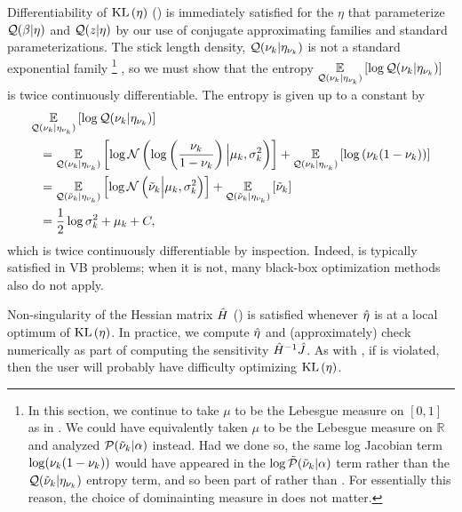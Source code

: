 Differentiability of $\mathrm{KL}\left(\eta\right)$ () is
immediately satisfied for the $\eta$ that parameterize $\mathcal{Q}(\beta \vert \eta)$
and $\mathcal{Q}(z \vert \eta)$ by our use of conjugate approximating families and
standard parameterizations.  The stick length density, $\mathcal{Q}(\nu_{k} \vert \eta_{\nu_{k}})$
is not a standard exponential family
%
\footnote{In this section, we continue to take $\mu$ to be the Lebesgue measure
on $[0,1]$ as in .  We could have equivalently taken
$\mu$ to be the Lebesgue measure on $\mathbb{R}$ and analyzed $\mathcal{P}(\tilde{\nu}_{k} \vert
\alpha)$ instead.  Had we done so, the same log Jacobian term $\log (\nu_{k}(1 -
\nu_{k}))$ would have appeared in the $\log \tilde{\mathcal{P}}(\tilde{\nu}_{k} \vert \alpha)$ term rather
than the $\mathcal{Q}(\tilde{\nu}_{k} \vert \eta_{\nu_{k}})$ entropy term, and so been part of
 rather than .  For
essentially this reason, the choice of dominainting measure in 
does not matter.}
%
, so we must show that the entropy $\underset{\mathcal{Q}(\nu_{k} \vert \eta_{\nu_{k}})}{\mathbb{E}}\left[\log \mathcal{Q}(\nu_{k}
\vert \eta_{\nu_{k}})\right]$ is  twice continuously differentiable. The entropy is given up
to a constant by
%
\begin{align*}
%
\MoveEqLeft
\expect{\q(\nuk \vert \etanuk)}{\log \q(\nuk \vert \etanuk)}
\\={}&
    \expect{\q(\nuk \vert \etanuk)}
           {\log \normdist{\log\left(\frac{\nu_\k}{1 - \nu_\k} \right)
               \Big\vert  \mu_\k, \sigma^2_\k}} +
    \expect{\q(\nuk \vert \etanuk)}
           {\log \left(\nuk (1 - \nuk)\right)}
\\={}&
   \expect{\q(\lnuk \vert \etanuk)}
          {\log \normdist{\lnuk \Big\vert  \mu_\k, \sigma^2_\k}} +
   \expect{\q(\lnuk \vert \etanuk)}{\lnuk}
\\={}&
    \frac{1}{2} \log \sigma^2_\k + \mu_\k + \const,
%
\end{align*}
%
which is twice continuously differentiable by inspection.
%
Indeed,  is typically satisfied in VB
problems; when it is not, many black-box optimization methods also do not apply.

Non-singularity of the Hessian matrix $\hat{H}$
() is satisfied whenever $\hat\eta$ is at a local
optimum of $\mathrm{KL}\left(\eta\right)$.  In practice, we compute $\hat\eta$ and (approximately)
check  numerically as part of computing the
sensitivity $\hat{H}^{-1} \hat J$.  As with
, if  is
violated, then the user will probably have difficulty optimizing $\mathrm{KL}\left(\eta\right)$.


